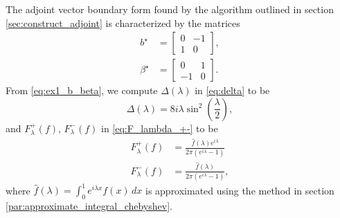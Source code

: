 \documentclass[12pt, oneside, a4paper]{article}
\begin{document}
The adjoint vector boundary form found by the algorithm outlined in section \ref{sec:construct_adjoint} is characterized by the matrices
\begin{subequations}\label{eq:ex1_b_beta}
\begin{align}
    b^\star &= \begin{bmatrix}0&-1\\ 1&0\end{bmatrix},\\
    \beta^\star &= \begin{bmatrix}0&1\\ -1&0\end{bmatrix}.
\end{align}
\end{subequations}
From \eqref{eq:ex1_b_beta}, we compute $\Delta(\lambda)$ in \eqref{eq:delta} to be 
\begin{equation}\label{eq:ex1_delta}
    \Delta(\lambda) = 8i\lambda \sin^2\left(\frac{\lambda}{2}\right),
\end{equation}
and $F_\lambda^+(f)$, $F_\lambda^-(f)$ in \eqref{eq:F_lambda_+-} to be
\begin{subequations}\label{eq:ex1_F_lambda_+-}
    \begin{align}
        F_\lambda^+(f) &= \frac{\hat{f}(\lambda)e^{i\lambda}}{2\pi(e^{i\lambda}-1)}\\
    F_\lambda^-(f) &= \frac{\hat{f}(\lambda)}{2\pi(e^{i\lambda}-1)},
    \end{align}
\end{subequations}
where 
$\hat{f}(\lambda)=\int_0^1 e^{i\lambda x}f(x)\,dx$ is approximated using the method in section \ref{par:approximate_integral_chebyshev}.
\end{document}
